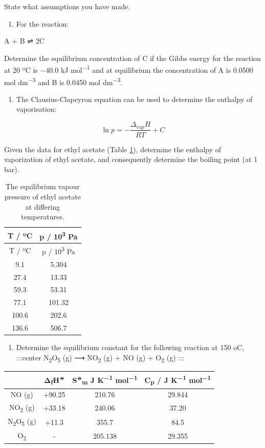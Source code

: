 \documentclass[
]{book}
\providecommand{\tightlist}{%
  \setlength{\itemsep}{0pt}\setlength{\parskip}{0pt}}
\begin{document}
State what assumptions you have made.

\begin{enumerate}
\def\labelenumi{\arabic{enumi}.}
\setcounter{enumi}{2}
\tightlist
\item
  For the reaction:
\end{enumerate}

A + B ⇌ 2C

Determine the equilibrium concentration of C if the Gibbs energy for the reaction at 20 ºC is −40.0 kJ mol\textsuperscript{−1} and at equilibrium the concentration of A is 0.0500 mol dm\textsuperscript{−3} and B is 0.0450 mol dm\textsuperscript{−3}.

\begin{enumerate}
\def\labelenumi{\arabic{enumi}.}
\setcounter{enumi}{3}
\tightlist
\item
  The Clausius-Clapeyron equation can be used to determine the enthalpy of vaporisation:
\end{enumerate}

\begin{equation*}
\ln p = -\frac{\Delta _{\textrm{vap}}H}{RT}+C
\end{equation*}

Given the data for ethyl acetate (Table \ref{tab:ethylacetatedata}), determine the enthalpy of vaporization of ethyl acetate, and consequently determine the boiling point (at 1 bar).

\begin{longtable}[]{@{}cc@{}}
\caption{\label{tab:ethylacetatedata} The equilibrium vapour pressure of ethyl acetate at differing temperatures.}\tabularnewline
\toprule
T / ºC & p / 10\textsuperscript{3} Pa\tabularnewline
\midrule
\endfirsthead
\toprule
T / ºC & p / 10\textsuperscript{3} Pa\tabularnewline
\midrule
\endhead
9.1 & 5.304\tabularnewline
27.4 & 13.33\tabularnewline
59.3 & 53.31\tabularnewline
77.1 & 101.32\tabularnewline
100.6 & 202.6\tabularnewline
136.6 & 506.7\tabularnewline
\bottomrule
\end{longtable}

\begin{enumerate}
\def\labelenumi{\arabic{enumi}.}
\setcounter{enumi}{4}
\tightlist
\item
  Determine the equilibrium constant for the following reaction at 150 oC,
  :::center
  N\textsubscript{2}O\textsubscript{5} (g) ⟶ NO\textsubscript{2} (g) + NO (g) + O\textsubscript{2} (g)
  :::
\end{enumerate}

\begin{longtable}[]{@{}cccc@{}}
\toprule
& Δ\textsubscript{f}H\textsuperscript{⦵} & S\textsuperscript{⦵}\textsubscript{m} J K\textsuperscript{−1} mol\textsuperscript{−1} & C\textsubscript{p} / J K\textsuperscript{−1} mol\textsuperscript{−1}\tabularnewline
\midrule
\endhead
NO (g) & +90.25 & 210.76 & 29.844\tabularnewline
NO\textsubscript{2} (g) & +33.18 & 240.06 & 37.20\tabularnewline
N\textsubscript{2}O\textsubscript{5} (g) & +11.3 & 355.7 & 84.5\tabularnewline
O\textsubscript{2} & - & 205.138 & 29.355\tabularnewline
\bottomrule
\end{longtable}
\end{document}
